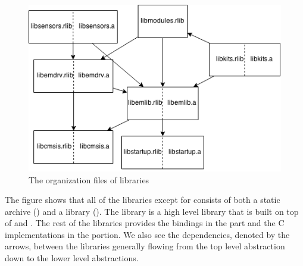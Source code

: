 \begin{figure}[H]
  \begin{center}
    \includegraphics[scale=0.5]{figures/lib-structure.png}
  \end{center}
  \caption{The organization files of libraries}
  \label{fig:lib:structure}
\end{figure}

The figure shows that all of the libraries except for  consists of both a {\C} static archive () and a {\rust} library ().
The  library is a high level library that is built on top of {\emlib} and .
The rest of the libraries provides the {\rust} bindings in the  part and the C implementations in the  portion.
We also see the dependencies, denoted by the arrows, between the libraries generally flowing from the top level abstraction down to the lower level abstractions.

